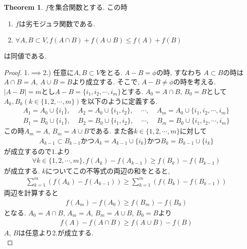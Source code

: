 \documentclass[11pt, a4paper, dvipdfmx]{jsbook}
\theoremstyle{definition}
\newtheorem{Theorem+}[Axiom+]{Theorem}
\begin{document}
\begin{Theorem+}$f$を集合関数とする. この時
  \begin{enumerate}
      \item $f$は劣モジュラ関数である.
      \item $\forall A, B\subset V, f(A\cap B) + f(A\cup B)\leq f(A) + f(B)$ 
  \end{enumerate}
  は同値である.
  \begin{proof}
      1.$\implies$2.) 任意に$A, B\subset V$をとる. $A - B = \phi$の時, すなわち
      $A\subset B$の時は$A\cap B = A$, $A\cup B = B$より成立する. そこで, $A - B\neq\phi$の時を考える.
      $| A - B| = m$とし$A - B = \{i_{1}, i_{2}, \cdots, i_{m}\}$とする. $A_{0} = A\cap B$, $B_{0} = B$として
      $A_{k}, B_{k} (k\in\{1, 2, \cdots, m\})$を以下のように定義する.
      \begin{align*}
          A_{1} = A_{0}\cup\{i_{1}\}, ~~~~~ A_{2} = A_{0}\cup\{i_{1}, i_{2}\},~~~~~  \cdots, ~~~~~ A_{m} = A_{0}\cup\{i_{1}, i_{2}, \cdots, i_{m}\}\\
          B_{1} = B_{0}\cup\{i_{1}\}, ~~~~~ B_{2} = B_{0}\cup\{i_{1}, i_{2}\},~~~~~  \cdots, ~~~~~ B_{m} = B_{0}\cup\{i_{1}, i_{2}, \cdots, i_{m}\}
      \end{align*}
      この時$A_{m} = A$, $B_{m} = A\cup B$である. また各$k\in\{1, 2, \cdots, m\}$に対して
      \begin{align*}
           A_{k - 1}\subset B_{k-1}かつA_{k} = A_{k-1}\cup\{i_{k}\}かつB_{k} = B_{k-1}\cup\{i_{k}\}
      \end{align*}
      が成立するので1.より
      \begin{align*}
          \forall k\in\{1, 2, \cdots, m\}, f(A_{k}) - f(A_{k - 1})\geq f(B_{k}) - f(B_{k-1})
      \end{align*}
      が成立する. $k$についてこの不等式の両辺の和をとると, 
      \begin{align*}
          \sum_{k =1}^{m}\left(f(A_{k}) - f(A_{k - 1})\right)\geq\sum_{k =1}^{m}\left(f(B_{k}) - f(B_{k - 1})\right)
      \end{align*}
      両辺を計算すると
      \begin{align*}
          f(A_{m}) - f(A_{0})\geq f(B_{m}) - f(B_{0})
      \end{align*}
      となる. $A_{0} = A\cap B$, $A_{m} = A$, $B_{m} = A\cup B$, $B_{0} = B$より
      \begin{align*}
          f(A) - f(A\cap B)\geq f(A\cup B) - f(B)
      \end{align*}
      $A$, $B$は任意より2.が成立する.\\


\end{proof}
\end{Theorem+}
\end{document}
